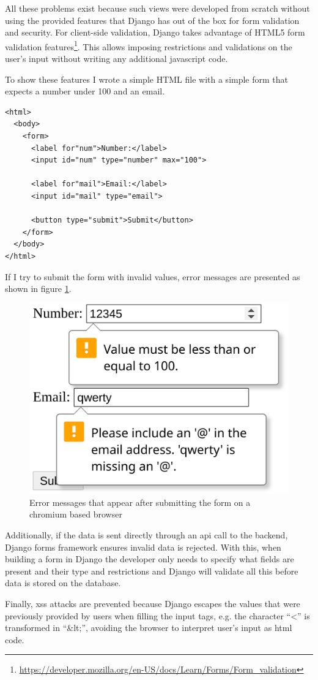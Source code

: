 All these problems exist because such views were developed from scratch without using the provided features that Django has out of the box for form validation and security.
For client-side validation, Django takes advantage of HTML5 form validation features\footnote{\url{https://developer.mozilla.org/en-US/docs/Learn/Forms/Form_validation}}.
This allows imposing restrictions and validations on the user's input without writing any additional javascript code.

To show these features I wrote a simple HTML file with a simple form that expects a number under 100 and an email.

\begin{verbatim}
<html>
  <body>
    <form>
      <label for"num">Number:</label>
      <input id="num" type="number" max="100">

      <label for"mail">Email:</label>
      <input id="mail" type="email">

      <button type="submit">Submit</button>
    </form>
  </body>
</html>
\end{verbatim}

If I try to submit the form with invalid values, error messages are presented as shown in figure \ref{fig:html-form-validation}.

\begin{figure}[h]
    \center
    \includegraphics[width=.3\textwidth]{html-form-validation}
    \caption{Error messages that appear after submitting the form on a chromium based browser}
    \label{fig:html-form-validation}
\end{figure}

Additionally, if the data is sent directly through an \gls{api} call to the backend, Django forms framework ensures invalid data is rejected.
With this, when building a form in Django the developer only needs to specify what fields are present and their type and restrictions and Django will validate all this before data is stored on the database.

Finally, \gls{xss} attacks are prevented because Django escapes the values that were previously provided by users when filling the input tags, e.g. the character ``<'' is transformed in ``\&lt;'', avoiding the browser to interpret user's input as \gls{html} code.

